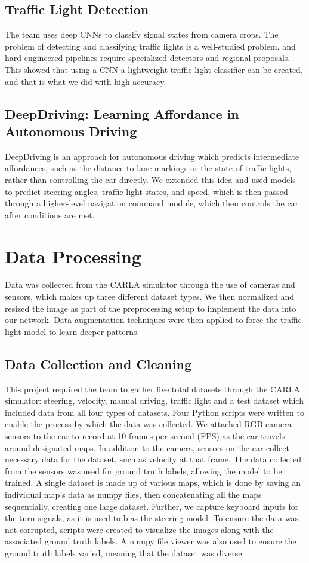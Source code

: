 \documentclass{article} %
\begin{document}
\subsection{Traffic Light Detection \citep{3.4Ref}}
The team uses deep CNNs to classify signal states from camera crops. The problem of detecting and classifying traffic lights is a
well-studied problem, and hard-engineered pipelines require specialized detectors and regional proposals. This showed that using a
CNN a lightweight traffic-light classifier can be created, and that is what we did with high accuracy.

\subsection{DeepDriving: Learning Affordance in Autonomous Driving \citep{3.5Ref}}
DeepDriving is an approach for autonomous driving which predicts intermediate affordances, such as the distance to
lane markings or the state of traffic lights, rather than controlling the car directly. We extended this idea and used
models to predict steering angles, traffic-light states, and speed, which is then passed through a higher-level navigation
command module, which then controls the car after conditions are met.


\section{Data Processing}

Data was collected from the CARLA simulator through the use of cameras and sensors, which makes up three different dataset types. We then normalized and resized the image as part of the preprocessing setup to implement the data into our network. Data augmentation techniques were then applied to force the traffic light model to learn deeper patterns.

\subsection{Data Collection and Cleaning}
This project required the team to gather five total datasets through the CARLA simulator: steering, velocity, manual driving, traffic light and a test 
dataset which included data from all four types of datasets. Four Python scripts were written to enable the process by which the data was collected. 
We attached RGB camera sensors to the car to record at 10 frames per second (FPS) as the car travels around designated maps. In addition to the camera, 
sensors on the car collect necessary data for the dataset, such as velocity at that frame. The data collected from the sensors was used for ground truth 
labels, allowing the model to be trained. A single dataset is made up of various maps, which is done by saving an individual map’s data as numpy files, 
then concatenating all the maps sequentially, creating one large dataset. Further, we capture keyboard inputs for the turn signals, as it is used to bias the steering model. To ensure the data was not corrupted, scripts were created to visualize the images 
along with the associated ground truth labels. A numpy file viewer was also used to ensure the ground truth labels varied, meaning that the dataset was diverse.
\end{document}
